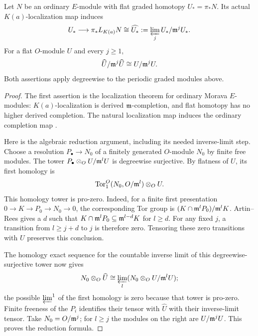 \begin{lemma}\label{wup:completion-reduction}
Let \(N\) be an ordinary \(E\)-module with flat graded homotopy
\(U_*=\pi_*N\). Its actual \(K(a)\)-localization map induces
\[
 U_*\longrightarrow\pi_*L_{K(a)}N
 \cong\widehat{U_*}:=\varprojlim_j U_*/\mathfrak m^jU_*.
\]
For a flat \(O\)-module \(U\) and every \(j\geq1\),
\[
 \widehat U/\mathfrak m^j\widehat U\cong U/\mathfrak m^jU.
\]
Both assertions apply degreewise to the periodic graded modules above.
\end{lemma}

\begin{proof}
The first assertion is the localization theorem for ordinary Morava
\(E\)-modules: \(K(a)\)-localization is derived \(\mathfrak m\)-completion,
and flat homotopy has no higher derived completion. The natural
localization map induces the ordinary completion map
\cite[Propositions~3.4, 3.6 and Corollary~3.8]{rezk2009}.

Here is the algebraic reduction argument, including its needed
inverse-limit step. Choose a resolution \(P_\bullet\to N_0\) of a
finitely generated \(O\)-module \(N_0\) by finite free modules.
The tower \(P_\bullet\otimes_O U/\mathfrak m^lU\) is degreewise surjective.
By flatness of \(U\), its first homology is
\[
 \operatorname{Tor}_1^O(N_0,O/\mathfrak m^l)\otimes_O U.
\]
This homology tower is pro-zero. Indeed, for a finite first
presentation \(0\to K\to P_0\to N_0\to0\), the corresponding Tor group
is \((K\cap\mathfrak m^lP_0)/\mathfrak m^lK\). Artin--Rees
\cite[Tag~00IN]{stacks} gives a \(d\) such that
\(K\cap\mathfrak m^lP_0\subseteq\mathfrak m^{l-d}K\) for \(l\geq d\).
For any fixed \(j\), a transition from \(l\geq j+d\) to \(j\)
is therefore zero. Tensoring these zero transitions with \(U\)
preserves this conclusion.

The homology exact sequence for the countable inverse limit of this
degreewise-surjective tower now gives
\[
 N_0\otimes_O\widehat U
 \cong\varprojlim_l(N_0\otimes_O U/\mathfrak m^lU);
\]
the possible \(\varprojlim^1\) of the first homology is zero because
that tower is pro-zero. Finite freeness of the \(P_i\) identifies
their tensor with \(\widehat U\) with their inverse-limit tensor.
Take \(N_0=O/\mathfrak m^j\); for \(l\geq j\) the modules on the right are
\(U/\mathfrak m^jU\). This proves the reduction formula.
\end{proof}

